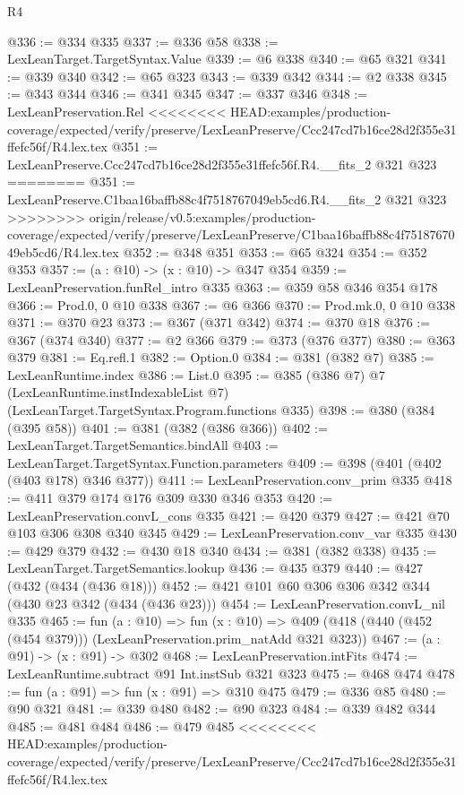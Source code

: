 \begin{lexlean}{R4}
\begin{coremodule}
{{{{{{{{{{{{{{{{{{{{@336 := @334 @335
@337 := @336 @58
@338 := LexLeanTarget.TargetSyntax.Value
@339 := @6 @338
@340 := @65 @321
@341 := @339 @340
@342 := @65 @323
@343 := @339 @342
@344 := @2 @338
@345 := @343 @344
@346 := @341 @345
@347 := @337 @346
@348 := LexLeanPreservation.Rel
<<<<<<<< HEAD:examples/production-coverage/expected/verify/preserve/LexLeanPreserve/Ccc247cd7b16ce28d2f355e31ffefc56f/R4.lex.tex
@351 := LexLeanPreserve.Ccc247cd7b16ce28d2f355e31ffefc56f.R4.__fits_2 @321 @323
========
@351 := LexLeanPreserve.C1baa16baffb88c4f7518767049eb5cd6.R4.__fits_2 @321 @323
>>>>>>>> origin/release/v0.5:examples/production-coverage/expected/verify/preserve/LexLeanPreserve/C1baa16baffb88c4f7518767049eb5cd6/R4.lex.tex
@352 := @348 @351
@353 := @65 @324
@354 := @352 @353
@357 := (a : @10) -> (x : @10) -> @347 @354
@359 := LexLeanPreservation.funRel_intro @335
@363 := @359 @58 @346 @354 @178
@366 := Prod.{0, 0} @10 @338
@367 := @6 @366
@370 := Prod.mk.{0, 0} @10 @338
@371 := @370 @23
@373 := @367 (@371 @342)
@374 := @370 @18
@376 := @367 (@374 @340)
@377 := @2 @366
@379 := @373 (@376 @377)
@380 := @363 @379
@381 := Eq.refl.{1}
@382 := Option.{0}
@384 := @381 (@382 @7)
@385 := LexLeanRuntime.index
@386 := List.{0}
@395 := @385
    (@386 @7)
    @7
    (LexLeanRuntime.instIndexableList @7)
    (LexLeanTarget.TargetSyntax.Program.functions @335)
@398 := @380 (@384 (@395 @58))
@401 := @381 (@382 (@386 @366))
@402 := LexLeanTarget.TargetSemantics.bindAll
@403 := LexLeanTarget.TargetSyntax.Function.parameters
@409 := @398 (@401 (@402 (@403 @178) @346 @377))
@411 := LexLeanPreservation.conv_prim @335
@418 := @411 @379 @174 @176 @309 @330 @346 @353
@420 := LexLeanPreservation.convL_cons @335
@421 := @420 @379
@427 := @421 @70 @103 @306 @308 @340 @345
@429 := LexLeanPreservation.conv_var @335
@430 := @429 @379
@432 := @430 @18 @340
@434 := @381 (@382 @338)
@435 := LexLeanTarget.TargetSemantics.lookup
@436 := @435 @379
@440 := @427 (@432 (@434 (@436 @18)))
@452 := @421 @101 @60 @306 @306 @342 @344 (@430 @23 @342 (@434 (@436 @23)))
@454 := LexLeanPreservation.convL_nil @335
@465 := fun (a : @10) =>
  fun (x : @10) => @409 (@418 (@440 (@452 (@454 @379))) (LexLeanPreservation.prim_natAdd @321 @323))
@467 := (a : @91) -> (x : @91) -> @302
@468 := LexLeanPreservation.intFits
@474 := LexLeanRuntime.subtract @91 Int.instSub @321 @323
@475 := @468 @474
@478 := fun (a : @91) => fun (x : @91) => @310 @475
@479 := @336 @85
@480 := @90 @321
@481 := @339 @480
@482 := @90 @323
@484 := @339 @482 @344
@485 := @481 @484
@486 := @479 @485
<<<<<<<< HEAD:examples/production-coverage/expected/verify/preserve/LexLeanPreserve/Ccc247cd7b16ce28d2f355e31ffefc56f/R4.lex.tex
}}}}}}}}}}}}}}}}}}}}
\end{coremodule}
\end{lexlean}
